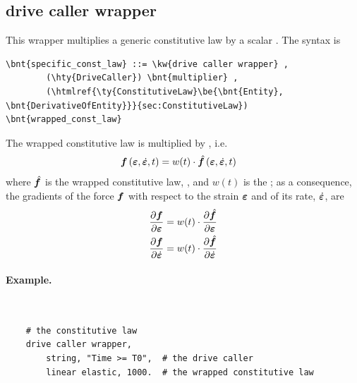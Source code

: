 \subsection{drive caller wrapper}
This wrapper multiplies a generic constitutive law by a scalar .
The syntax is
\begin{Verbatim}[commandchars=\\\{\}]
    \bnt{specific_const_law} ::= \kw{drive caller wrapper} ,
        (\hty{DriveCaller}) \bnt{multiplier} ,
        (\htmlref{\ty{ConstitutiveLaw}\be{\bnt{Entity}, \bnt{DerivativeOfEntity}}}{sec:ConstitutiveLaw}) \bnt{wrapped_const_law}
\end{Verbatim}
The wrapped constitutive law  is multiplied by , i.e.\
\begin{align}
	\boldsymbol{f}\left( \boldsymbol{\varepsilon}, \dot{\boldsymbol{\varepsilon}}, t \right) &= w(t) \cdot \hat{\boldsymbol{f}}\left( \boldsymbol{\varepsilon}, \dot{\boldsymbol{\varepsilon}}, t \right)
\end{align}
where $\hat{\boldsymbol{f}}$ is the wrapped constitutive law, , and $w(t)$ is the  ;
as a consequence, the gradients of the force $\boldsymbol{f}$ with respect to the strain $\boldsymbol{\varepsilon}$ and of its rate, $\dot{\boldsymbol{\varepsilon}}$,
are
\begin{subequations}
\begin{align}
	\frac{\partial \boldsymbol{f}}{\partial\boldsymbol{\varepsilon}} &= w(t) \cdot \frac{\partial \hat{\boldsymbol{f}}}{\partial\boldsymbol{\varepsilon}}
	\\
	\frac{\partial \boldsymbol{f}}{\partial\dot{\boldsymbol{\varepsilon}}} &= w(t) \cdot \frac{\partial \hat{\boldsymbol{f}}}{\partial\dot{\boldsymbol{\varepsilon}}}
\end{align}
\end{subequations}

\paragraph{Example.} \
\begin{verbatim}
    # the constitutive law
    drive caller wrapper,
        string, "Time >= T0",  # the drive caller
        linear elastic, 1000.  # the wrapped constitutive law
\end{verbatim}


